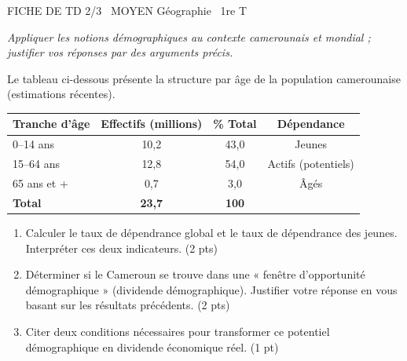 \documentclass[11pt]{article}
\begin{document}
\begin{tcolorbox}[enhanced,colback=popink,colframe=popink,arc=10pt,boxrule=0pt,left=12pt,right=12pt,top=9pt,bottom=9pt]
{\color{white}\popxbold\small FICHE DE TD 2/3 \textbullet\ MOYEN \hfill Géographie \textbullet\ 1re T\par}
\end{tcolorbox}
\vspace{4pt}
\emph{Appliquer les notions démographiques au contexte camerounais et mondial ; justifier vos réponses par des arguments précis.}

\begin{exercice}
Le tableau ci-dessous présente la structure par âge de la population camerounaise (estimations récentes).

\begin{center}
\begin{tabular}{|l|c|c|c|}
\hline
\textbf{Tranche d'âge} & \textbf{Effectifs (millions)} & \textbf{\% Total} & \textbf{Dépendance} \\
\hline
0--14 ans & 10,2 & 43,0 & Jeunes \\
15--64 ans & 12,8 & 54,0 & Actifs (potentiels) \\
65 ans et + & 0,7 & 3,0 & Âgés \\
\hline
\textbf{Total} & \textbf{23,7} & \textbf{100} &  \\
\hline
\end{tabular}
\end{center}

\begin{enumerate}
    \item Calculer le taux de dépendrance global et le taux de dépendrance des jeunes. Interpréter ces deux indicateurs. (2 pts)
    \item Déterminer si le Cameroun se trouve dans une « fenêtre d'opportunité démographique » (dividende démographique). Justifier votre réponse en vous basant sur les résultats précédents. (2 pts)
    \item Citer deux conditions nécessaires pour transformer ce potentiel démographique en dividende économique réel. (1 pt)
\end{enumerate}
\end{exercice}
\end{document}
